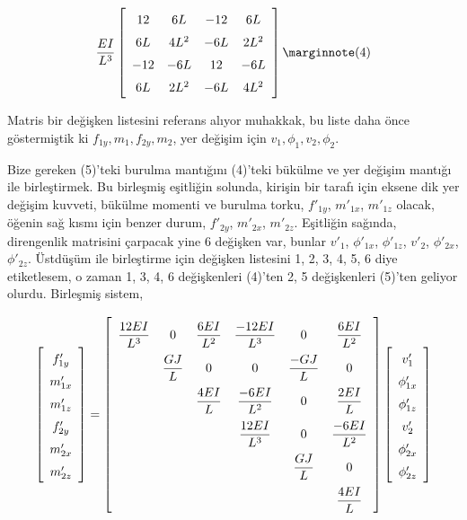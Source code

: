 \documentclass[12pt,fleqn]{article}\usepackage{../../common}
\begin{document}
$$
\frac{EI}{L^3}
\left[\begin{array}{cccc}
12 & 6L & -12 & 6L \\
6L & 4L^2 & -6L & 2L^2 \\
-12 & -6L & 12 & -6L \\
6L & 2L^2 & -6L & 4L^2
\end{array}\right]
\mlabel{4}
$$

Matris bir değişken listesini referans alıyor muhakkak, bu liste daha
önce göstermiştik ki $f_{1y}, m_1, f_{2y}, m_2$, yer değişim için
$v_1, \phi_1, v_2, \phi_2$. 

Bize gereken (5)'teki burulma mantığını (4)'teki bükülme ve yer değişim mantığı
ile birleştirmek. Bu birleşmiş eşitliğin solunda, kirişin bir tarafı için eksene
dik yer değişim kuvveti, bükülme momenti ve burulma torku, $f'_{1y}$, $m'_{1x}$,
$m'_{1z}$ olacak, öğenin sağ kısmı için benzer durum, $f'_{2y}$, $m'_{2x}$,
$m'_{2z}$.  Eşitliğin sağında, direngenlik matrisini çarpacak yine 6 değişken
var, bunlar $v'_1$, $\phi'_{1x}$, $\phi'_{1z}$, $v'_2$, $\phi'_{2x}$,
$\phi'_{2z}$. Üstdüşüm ile birleştirme için değişken listesini 1, 2, 3, 4, 5, 6
diye etiketlesem, o zaman 1, 3, 4, 6 değişkenleri (4)'ten 2, 5 değişkenleri
(5)'ten geliyor olurdu. Birleşmiş sistem,

$$
\renewcommand*{\arraystretch}{1.5}
\left[\begin{array}{c}
f'_{1y} \\ m'_{1x} \\ m'_{1z} \\ f'_{2y} \\ m'_{2x} \\ m'_{2z} 
\end{array}\right] =
\renewcommand*{\arraystretch}{2.2}
\left[\begin{array}{cccccc}
\dfrac{12 EI}{L^3} & 0 & \dfrac{6 EI}{L^2} & \dfrac{-12EI}{L^3} & 0 & \dfrac{6EI}{L^2}\\
 & \dfrac{GJ}{L} & 0 & 0 & \dfrac{-GJ}{L} & 0 \\
 & & \dfrac{4EI}{L} & \dfrac{-6EI}{L^2} & 0 & \dfrac{2EI}{L} \\
 & & & \dfrac{12EI}{L^3} & 0 & \dfrac{-6EI}{L^2} \\
 & & & & \dfrac{GJ}{L} & 0 \\
 & & & & & \dfrac{4EI}{L} 
\end{array}\right]
\renewcommand*{\arraystretch}{1.5}
\left[\begin{array}{c}
v'_1 \\ \phi'_{1x} \\ \phi'_{1z} \\ v'_2 \\ \phi'_{2x} \\ \phi'_{2z}
\end{array}\right]
$$
\end{document}
